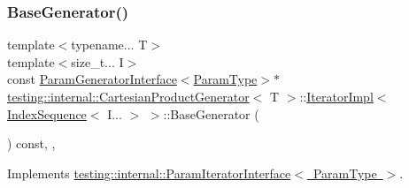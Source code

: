 \subsubsection{\texorpdfstring{BaseGenerator()}{BaseGenerator()}\hspace{0.1cm}{\footnotesize\ttfamily [2/2]}}
{\footnotesize\ttfamily template$<$typename... T$>$ \\
template$<$size\+\_\+t... I$>$ \\
const \mbox{\hyperlink{classtesting_1_1internal_1_1_param_generator_interface}{Param\+Generator\+Interface}}$<$\mbox{\hyperlink{classtesting_1_1internal_1_1_cartesian_product_generator_af27131157a9347f0c82420ca081ee7dd}{Param\+Type}}$>$$\ast$ \mbox{\hyperlink{classtesting_1_1internal_1_1_cartesian_product_generator}{testing\+::internal\+::\+Cartesian\+Product\+Generator}}$<$ T $>$\+::\mbox{\hyperlink{classtesting_1_1internal_1_1_cartesian_product_generator_1_1_iterator_impl}{Iterator\+Impl}}$<$ \mbox{\hyperlink{structtesting_1_1internal_1_1_index_sequence}{Index\+Sequence}}$<$ I... $>$ $>$\+::Base\+Generator (\begin{DoxyParamCaption}{ }\end{DoxyParamCaption}) const\hspace{0.3cm}{\ttfamily [inline]}, {\ttfamily [override]}, {\ttfamily [virtual]}}



Implements \mbox{\hyperlink{classtesting_1_1internal_1_1_param_iterator_interface_a17500953df75ecda1ace46c08ff731e9}{testing\+::internal\+::\+Param\+Iterator\+Interface$<$ Param\+Type $>$}}.

\mbox{\label{classtesting_1_1internal_1_1_cartesian_product_generator_1_1_iterator_impl_3_01_index_sequence_3_01_i_8_8_8_01_4_01_4_a0b434e09b32dfd6b444085cf95dc22ab}} 
